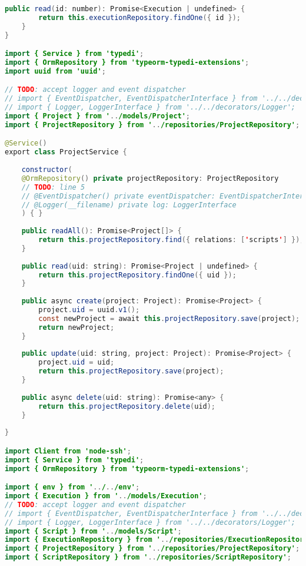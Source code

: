 \begin{lstlisting}[language=java]
	public read(id: number): Promise<Execution | undefined> {
		return this.executionRepository.findOne({ id });
	}
}

import { Service } from 'typedi';
import { OrmRepository } from 'typeorm-typedi-extensions';
import uuid from 'uuid';

// TODO: accept logger and event dispatcher
// import { EventDispatcher, EventDispatcherInterface } from '../../decorators/EventDispatcher';
// import { Logger, LoggerInterface } from '../../decorators/Logger';
import { Project } from '../models/Project';
import { ProjectRepository } from '../repositories/ProjectRepository';

@Service()
export class ProjectService {
	
	constructor(
	@OrmRepository() private projectRepository: ProjectRepository
	// TODO: line 5
	// @EventDispatcher() private eventDispatcher: EventDispatcherInterface,
	// @Logger(__filename) private log: LoggerInterface
	) { }
	
	public readAll(): Promise<Project[]> {
		return this.projectRepository.find({ relations: ['scripts'] });
	}
	
	public read(uid: string): Promise<Project | undefined> {
		return this.projectRepository.findOne({ uid });
	}
	
	public async create(project: Project): Promise<Project> {
		project.uid = uuid.v1();
		const newProject = await this.projectRepository.save(project);
		return newProject;
	}
	
	public update(uid: string, project: Project): Promise<Project> {
		project.uid = uid;
		return this.projectRepository.save(project);
	}
	
	public async delete(uid: string): Promise<any> {
		return this.projectRepository.delete(uid);
	}
	
}

import Client from 'node-ssh';
import { Service } from 'typedi';
import { OrmRepository } from 'typeorm-typedi-extensions';

import { env } from '../../env';
import { Execution } from '../models/Execution';
// TODO: accept logger and event dispatcher
// import { EventDispatcher, EventDispatcherInterface } from '../../decorators/EventDispatcher';
// import { Logger, LoggerInterface } from '../../decorators/Logger';
import { Script } from '../models/Script';
import { ExecutionRepository } from '../repositories/ExecutionRepository';
import { ProjectRepository } from '../repositories/ProjectRepository';
import { ScriptRepository } from '../repositories/ScriptRepository';


\end{lstlisting}
